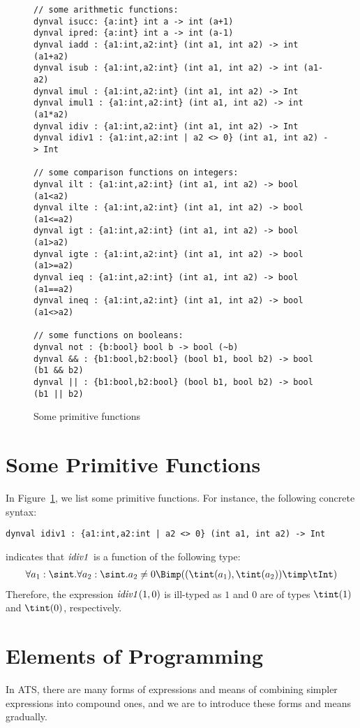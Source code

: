 \begin{figure}
\begin{verbatim}
// some arithmetic functions:
dynval isucc: {a:int} int a -> int (a+1)
dynval ipred: {a:int} int a -> int (a-1)
dynval iadd : {a1:int,a2:int} (int a1, int a2) -> int (a1+a2)
dynval isub : {a1:int,a2:int} (int a1, int a2) -> int (a1-a2)
dynval imul : {a1:int,a2:int} (int a1, int a2) -> Int
dynval imul1 : {a1:int,a2:int} (int a1, int a2) -> int (a1*a2)
dynval idiv : {a1:int,a2:int} (int a1, int a2) -> Int
dynval idiv1 : {a1:int,a2:int | a2 <> 0} (int a1, int a2) -> Int

// some comparison functions on integers:
dynval ilt : {a1:int,a2:int} (int a1, int a2) -> bool (a1<a2)
dynval ilte : {a1:int,a2:int} (int a1, int a2) -> bool (a1<=a2)
dynval igt : {a1:int,a2:int} (int a1, int a2) -> bool (a1>a2)
dynval igte : {a1:int,a2:int} (int a1, int a2) -> bool (a1>=a2)
dynval ieq : {a1:int,a2:int} (int a1, int a2) -> bool (a1==a2)
dynval ineq : {a1:int,a2:int} (int a1, int a2) -> bool (a1<>a2)

// some functions on booleans:
dynval not : {b:bool} bool b -> bool (~b)
dynval && : {b1:bool,b2:bool} (bool b1, bool b2) -> bool (b1 && b2)
dynval || : {b1:bool,b2:bool} (bool b1, bool b2) -> bool (b1 || b2)
\end{verbatim}
\caption{Some primitive functions}
\label{figure:some_primitive_functions}
\end{figure}
\section{Some Primitive Functions}
In Figure~\ref{figure:some_primitive_functions}, we list some primitive
functions. For instance, the following concrete syntax:
\begin{verbatim}
dynval idiv1 : {a1:int,a2:int | a2 <> 0} (int a1, int a2) -> Int
\end{verbatim}
indicates that ${\it idiv1}$ is a function of the following type:
\[\begin{array}{c}
\forall a_1:\sint.\forall a_2:\sint.a_2\neq 0 \Bimp((\tint(a_1), \tint(a_2))\timp\tInt) \\
\end{array}\]
Therefore, the expression ${\it idiv1}(1, 0)$ is ill-typed as $1$ and $0$
are of types $\tint(1)$ and $\tint(0)$, respectively.

\section{Elements of Programming}
In ATS, there are many forms of expressions and means of combining
simpler expressions into compound ones, and we are to introduce
these forms and means gradually.

